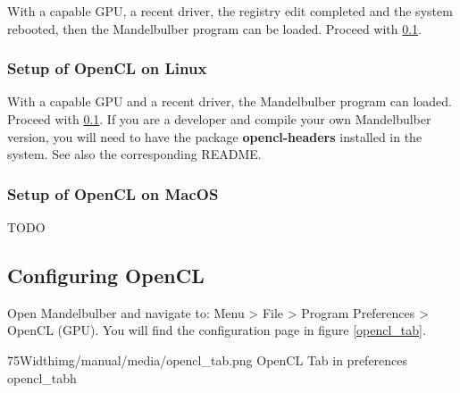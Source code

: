 With a capable GPU, a recent driver, the registry edit completed and the system rebooted, then the Mandelbulber program can be loaded.
Proceed with \ref{configure-opencl}. 

\subsubsection{Setup of OpenCL on Linux}\label{setup-opencl-linux}
With a capable GPU and a recent driver, the Mandelbulber program can loaded.
Proceed with \ref{configure-opencl}. 
If you are a developer and compile your own Mandelbulber version,
you will need to have the package \textbf{opencl-headers} installed in the system.  
See also the corresponding README.

\subsubsection{Setup of OpenCL on MacOS}\label{setup-opencl-macos}
TODO

\subsection{Configuring OpenCL}\label{configure-opencl}
Open Mandelbulber and navigate to: Menu > File > Program Preferences > OpenCL (GPU).
You will find the configuration page in figure \ref{opencl_tab}.

\simpleImageWithCaption75Width{img/manual/media/opencl_tab.png}
{OpenCL Tab in preferences}
{opencl_tab}{h}

